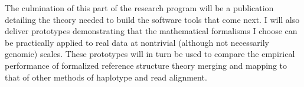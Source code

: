 \documentclass[11pt,proposal]{ucthesis}
\begin{document}
The culmination of this part of the research program will be a publication detailing the theory needed to build the software tools that come next. I will also deliver prototypes demonstrating that the mathematical formalisms I choose can be practically applied to real data at nontrivial (although not necessarily genomic) scales. These prototypes will in turn be used to compare the empirical performance of formalized reference structure theory merging and mapping to that of other methods of haplotype and read alignment.


    
    
    
        
        
        
        
        
    
    
        
        
        
        
    
    
        
\end{document}
